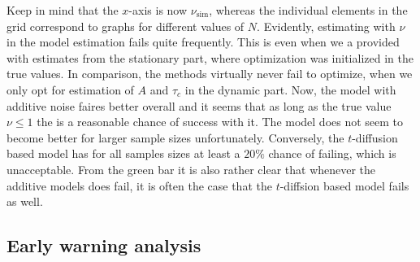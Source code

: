 Keep in mind that the $x$-axis is now $\nu_{\mathrm{sim}}$, whereas the individual elements in the grid correspond to graphs for different values of $N$. Evidently, estimating with $\nu$ in the model estimation fails quite frequently. This is even when we a provided with estimates from the stationary part, where optimization was initialized in the true values. In comparison, the methods virtually never fail to optimize, when we only opt for estimation of $A$ and $\tau_c$ in the dynamic part. Now, the model with additive noise faires better overall and it seems that as long as the true value $\nu\leq 1$ the is a reasonable chance of success with it. The model does not seem to become better for larger sample sizes unfortunately. Conversely, the $t$-diffusion based model has for all samples sizes at least a $20\%$ chance of failing, which is unacceptable. From the green bar it is also rather clear that whenever the additive models does fail, it is often the case that the $t$-diffsion based model fails as well.  
\subsection{Early warning analysis}

